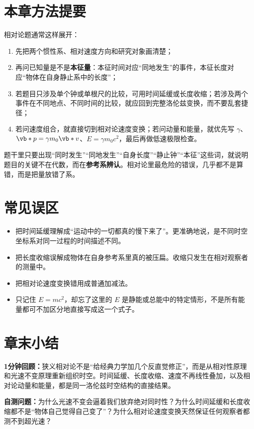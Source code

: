 \documentclass[lang=cn,11pt]{elegantbook}
\newcommand{\summaryline}[1]{\par\noindent\textbf{1分钟回顾：}#1\par}
\newcommand{\chapterselfcheck}[1]{\par\noindent\textbf{自测问题：}#1\par}
\begin{document}
\section{本章方法提要}

相对论题通常这样展开：
\begin{enumerate}
 \item 先把两个惯性系、相对速度方向和研究对象画清楚；
 \item 再问已知量是不是\textbf{本征量}：本征时间对应“同地发生”的事件，本征长度对应“物体在自身静止系中的长度”；
 \item 若题目只涉及单个钟或单根尺的比较，可用时间延缓或长度收缩；若涉及两个事件在不同地点、不同时间的比较，就应回到完整洛伦兹变换，而不要乱套捷径；
 \item 若问速度组合，就直接切到相对论速度变换；若问动量和能量，就优先写 \(\gamma\)、\(\vb*{p}=\gamma m_0\vb*{v}\)、\(E=\gamma m_0c^2\)，最后再做低速极限检查。
\end{enumerate}

\begin{remark}
题干里只要出现“同时发生”“同地发生”“自身长度”“静止钟”“本征”这些词，就说明题目的关键不在代数，而在\textbf{参考系辨认}。相对论里最危险的错误，几乎都不是算错，而是把量放错了系。
\end{remark}

\section{常见误区}

\begin{itemize}
 \item 把时间延缓理解成“运动中的一切都真的慢下来了”。更准确地说，是不同时空坐标系对同一过程的时间描述不同。
 \item 把长度收缩误解成物体在自身参考系里真的被压扁。收缩只发生在相对观察者的测量中。
 \item 把相对论速度变换错用成普通加减法。
 \item 只记住 \(E=mc^2\)，却忘了这里的 \(E\) 是静能或总能中的特定情形，不是所有能量都可不加区分地直接写成这一个式子。
\end{itemize}

\section{章末小结}

\summaryline{狭义相对论不是“给经典力学加几个反直觉修正”，而是从相对性原理和光速不变原理重新组织时空。时间延缓、长度收缩、速度不再线性叠加，以及相对论动量和能量，都是同一洛伦兹时空结构的直接结果。}
\chapterselfcheck{为什么光速不变会逼着我们放弃绝对同时性？为什么时间延缓和长度收缩都不是“物体自己觉得自己变了”？为什么相对论速度变换天然保证任何观察者都测不到超光速？}
\end{document}
